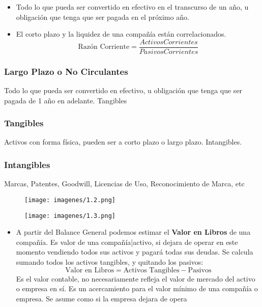 \begin{itemize}
    \item Todo  lo  que  pueda  ser  convertido  en  efectivo  en  el  transcurso  de  un  año,  u  
    obligación que tenga que ser pagada en el próximo año. 
    \item El corto plazo y la liquidez de una compañía están correlacionados. 
    $$\text{Razón Corriente} = \frac{Activos Corrientes}{Pasivos Corrientes} $$
\end{itemize}

\subsubsection{Largo Plazo o No Circulantes }
Todo  lo  que  pueda  ser  convertido  en  efectivo,  u    obligación  que  tenga  que  ser 
pagada de 1 año en adelante. 
Tangibles 

\subsubsection{Tangibles}
Activos con forma física, pueden ser a corto plazo o largo plazo. 
Intangibles.

\subsubsection{Intangibles}
Marcas, Patentes, Goodwill, Licencias de Uso, Reconocimiento de Marca, etc

\begin{figure}[H]
    \centering
    \texttt{[image: imagenes/1.2.png]}
\end{figure}

\begin{figure}[H]
    \centering
    \texttt{[image: imagenes/1.3.png]}
\end{figure}

\begin{itemize}
    \item A  partir  del  Balance  General  podemos  estimar  el  \textbf{Valor en Libros}  de  una compañía. Es  valor  de  una  compañía|activo,  si  dejara  de  operar  en  este  momento vendiendo todos sus activos y pagará todas sus deudas. Se calcula sumando todos los activos tangibles, y quitando los pasivos: 
    $$\text{Valor en Libros} = \text{Activos Tangibles} - \text{Pasivos} $$
    Es  el  valor  contable,  no  necesariamente  refleja  el  valor  de  mercado  del activo  o  empresa  en  sí.  Es  un  acercamiento  para  el  valor  mínimo  de  una compañía o empresa. Se asume como si la empresa dejara de opera
\end{itemize}




